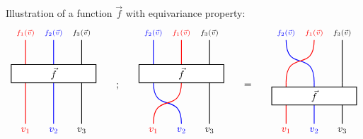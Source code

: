 Illustration of a function $\vec{f}$ with equivariance property:
\begin{equation}
\begin{tikzpicture}[every path/.style={thick}]
\node[red,above] (x0) at (0, 3) {${\scriptstyle f_1(\vec{v})}$};
\node[blue,above] (x1) at (1, 3) {${\scriptstyle f_2(\vec{v})}$};
\node[above] (x2) at (2, 3) {${\scriptstyle f_3(\vec{v})}$};
\node[] (z0) at (0, 1.5) {};
\node[] (z1) at (1, 1.5) {};
\node[] (z2) at (2, 1.5) {};
\node[red,below] (v0) at (0, 0) {$v_1$};
\node[blue,below] (v1) at (1, 0) {$v_2$};
\node[below] (v2) at (2, 0) {$v_3$};
\draw[red] (x0) to (z0.center);
\draw[blue] (x1) to (z1.center);
\draw (x2) to (z2.center);
\draw[red] (z0.center) to (v0);
\draw[blue] (z1.center) to (v1);
\draw (z2.center) to (v2);
\node[inner xsep=40pt,draw,in front of path,fill=white] (f) at (1,1.8) {$\vec{f}$};
\end{tikzpicture}
\qquad \raisebox{5em}{;} \qquad
\begin{tikzpicture}[every path/.style={thick}]
\node[blue,above] (x0) at (0, 3) {${\scriptstyle f_2(\vec{v})}$};
\node[red,above] (x1) at (1, 3) {${\scriptstyle f_1(\vec{v})}$};
\node[above] (x2) at (2, 3) {${\scriptstyle f_3(\vec{v})}$};
\node[] (z0) at (0, 1.5) {};
\node[] (z1) at (1, 1.5) {};
\node[] (z2) at (2, 1.5) {};
\node[red,below] (v0) at (0, 0) {$v_1$};
\node[blue,below] (v1) at (1, 0) {$v_2$};
\node[below] (v2) at (2, 0) {$v_3$};
\draw[blue] (x0) to (z0.center);
\draw[red] (x1) to (z1.center);
\draw (x2) to (z2.center);
\draw[blue] (z0.center) .. controls (0,0.3) and (1,1.2) .. (v1);
\draw[red] (z1.center) .. controls (1,0.3) and (0,1.2) .. (v0);
\draw (z2.center) to (v2);
\node[inner xsep=40pt,draw,in front of path,fill=white] (f) at (1,1.8) {$\vec{f}$};
\end{tikzpicture}
\qquad \raisebox{5em}{=} \qquad
\begin{tikzpicture}[every path/.style={thick}]
\node[blue,above] (x0) at (0, 3) {${\scriptstyle f_2(\vec{v})}$};
\node[red,above] (x1) at (1, 3) {${\scriptstyle f_1(\vec{v})}$};
\node[above] (x2) at (2, 3) {${\scriptstyle f_3(\vec{v})}$};
\node[] (z0) at (0, 1.5) {};
\node[] (z1) at (1, 1.5) {};
\node[] (z2) at (2, 1.5) {};
\node[red,below] (v0) at (0, 0) {$v_1$};
\node[blue,below] (v1) at (1, 0) {$v_2$};
\node[below] (v2) at (2, 0) {$v_3$};
\draw[blue] (x0) .. controls (0,1.8) and (1,2.7) .. (z1.center);
\draw[red] (x1) .. controls (1,1.8) and (0,2.7) .. (z0.center);
\draw (x2) to (z2.center);
\draw[red] (z0.center) to (v0);
\draw[blue] (z1.center) to (v1);
\draw (z2.center) to (v2);
\node[inner xsep=40pt,draw,in front of path,fill=white] (f) at (1,1) {$\vec{f}$};
\end{tikzpicture}
\end{equation}

